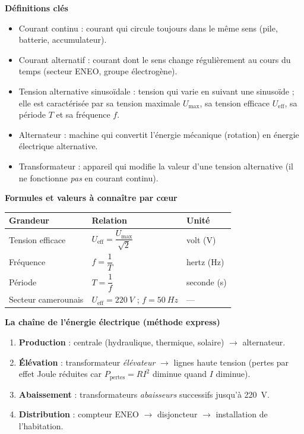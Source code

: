 \documentclass[11pt]{article}
\newcommand{\cle}[1]{{\popxbold\color{popdark}#1}}
\begin{document}
\begin{bilan}
\textbf{D\'efinitions cl\'es}
\begin{itemize}
  \item \cle{Courant continu} : courant qui circule toujours dans le m\^eme sens (pile, batterie, accumulateur).
  \item \cle{Courant alternatif} : courant dont le sens change r\'eguli\`erement au cours du temps (secteur ENEO, groupe \'electrog\`ene).
  \item \cle{Tension alternative sinuso\"idale} : tension qui varie en suivant une sinuso\"ide ; elle est caract\'eris\'ee par sa \cle{tension maximale} $U_{\max}$, sa \cle{tension efficace} $U_{\mathrm{eff}}$, sa \cle{p\'eriode} $T$ et sa \cle{fr\'equence} $f$.
  \item \cle{Alternateur} : machine qui convertit l'\'energie m\'ecanique (rotation) en \'energie \'electrique alternative.
  \item \cle{Transformateur} : appareil qui modifie la valeur d'une tension alternative (il ne fonctionne \emph{pas} en courant continu).
\end{itemize}

\textbf{Formules et valeurs \`a conna\^itre par c\oe ur}
\begin{center}
\begin{tabularx}{\linewidth}{|l|X|l|}\hline
\rowcolor{popblueL} \textbf{Grandeur} & \textbf{Relation} & \textbf{Unit\'e} \\ \hline
Tension efficace & $U_{\mathrm{eff}} = \dfrac{U_{\max}}{\sqrt{2}}$ & volt (V) \\ \hline
Fr\'equence & $f = \dfrac{1}{T}$ & hertz (Hz) \\ \hline
P\'eriode & $T = \dfrac{1}{f}$ & seconde (s) \\ \hline
Secteur camerounais & $U_{\mathrm{eff}} = \SI{220}{V}$ ; $f = \SI{50}{Hz}$ & --- \\ \hline
\end{tabularx}
\end{center}

\textbf{La cha\^ine de l'\'energie \'electrique (m\'ethode express)}
\begin{enumerate}
  \item \textbf{Production} : centrale (hydraulique, thermique, solaire) $\rightarrow$ alternateur.
  \item \textbf{\'El\'evation} : transformateur \emph{\'el\'evateur} $\rightarrow$ lignes haute tension (pertes par effet Joule r\'eduites car $P_{\mathrm{pertes}} = R I^2$ diminue quand $I$ diminue).
  \item \textbf{Abaissement} : transformateurs \emph{abaisseurs} successifs jusqu'\`a \SI{220}{V}.
  \item \textbf{Distribution} : compteur ENEO $\rightarrow$ disjoncteur $\rightarrow$ installation de l'habitation.
\end{enumerate}


\end{bilan}
\end{document}
